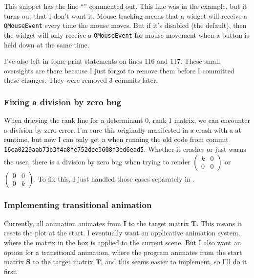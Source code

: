 \documentclass[../development.tex]{subfiles}
\begin{document}

This snippet has the line \enquote{} commented out. This line was in the example, but it turns out that I don't want it. Mouse tracking means that a widget will receive a \texttt{QMouseEvent} every time the mouse moves. But if it's disabled (the default), then the widget will only receive a \texttt{QMouseEvent} for mouse movement when a button is held down at the same time.

I've also left in some print statements on lines 116 and 117. These small oversights are there because I just forgot to remove them before I committed these changes. They were removed 3 commits later.

\subsubsection{Fixing a division by zero bug\label{development:improving-the-gui:fixing-a-division-by-zero-bug}}

When drawing the rank line for a determinant 0, rank 1 matrix, we can encounter a division by zero error. I'm sure this originally manifested in a crash with a  at runtime, but now I can only get a  when running the old code from commit \texttt{16ca0229aab73b3f4a8fe752dee3608f3ed6ead5}. Whether it crashes or just warns the user, there is a division by zero bug when trying to render $\begin{pmatrix}k & 0\\ 0 & 0\end{pmatrix}$ or $\begin{pmatrix}0 & 0\\ 0 & k\end{pmatrix}$. To fix this, I just handled those cases separately in .


\subsubsection{Implementing transitional animation\label{development:improving-the-gui:implementing-transitional-animation}}

Currently, all animation animates from $\mathbf{I}$ to the target matrix $\mathbf{T}$. This means it resets the plot at the start. I eventually want an applicative animation system, where the matrix in the box is applied to the current scene. But I also want an option for a transitional animation, where the program animates from the start matrix $\mathbf{S}$ to the target matrix $\mathbf{T}$, and this seems easier to implement, so I'll do it first.
\end{document}
